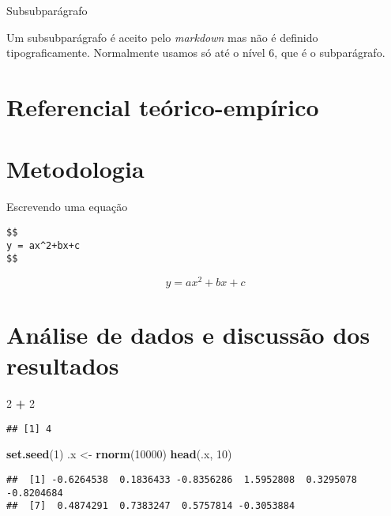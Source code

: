 \documentclass[
]{book}
\newenvironment{Shaded}{\begin{snugshade}}{\end{snugshade}}
\newcommand{\DecValTok}[1]{\textcolor[rgb]{0.00,0.00,0.81}{#1}}
\newcommand{\FunctionTok}[1]{\textcolor[rgb]{0.13,0.29,0.53}{\textbf{#1}}}
\newcommand{\NormalTok}[1]{#1}
\newcommand{\OtherTok}[1]{\textcolor[rgb]{0.56,0.35,0.01}{#1}}
\newcommand{\SpecialCharTok}[1]{\textcolor[rgb]{0.81,0.36,0.00}{\textbf{#1}}}
\begin{document}
Subsubparágrafo

Um subsubparágrafo é aceito pelo \emph{markdown} mas não é definido
tipograficamente. Normalmente usamos só até o nível 6, que é o
subparágrafo.

\hypertarget{referencial-teuxf3rico-empuxedrico}{%
\chapter{Referencial
teórico-empírico}\label{referencial-teuxf3rico-empuxedrico}}

\hypertarget{metodologia}{%
\chapter{Metodologia}\label{metodologia}}

Escrevendo uma equação

\begin{verbatim}
$$
y = ax^2+bx+c
$$
\end{verbatim}

\[
y = ax^2+bx+c
\]

\hypertarget{anuxe1lise-de-dados-e-discussuxe3o-dos-resultados}{%
\chapter{Análise de dados e discussão dos
resultados}\label{anuxe1lise-de-dados-e-discussuxe3o-dos-resultados}}

\begin{Shaded}
\begin{Highlighting}[]
\DecValTok{2} \SpecialCharTok{+} \DecValTok{2}
\end{Highlighting}
\end{Shaded}

\begin{verbatim}
## [1] 4
\end{verbatim}

\begin{Shaded}
\begin{Highlighting}[]
\FunctionTok{set.seed}\NormalTok{(}\DecValTok{1}\NormalTok{)}
\NormalTok{.x }\OtherTok{\textless{}{-}} \FunctionTok{rnorm}\NormalTok{(}\DecValTok{10000}\NormalTok{)}
\FunctionTok{head}\NormalTok{(.x, }\DecValTok{10}\NormalTok{)}
\end{Highlighting}
\end{Shaded}

\begin{verbatim}
##  [1] -0.6264538  0.1836433 -0.8356286  1.5952808  0.3295078 -0.8204684
##  [7]  0.4874291  0.7383247  0.5757814 -0.3053884
\end{verbatim}
\end{document}
